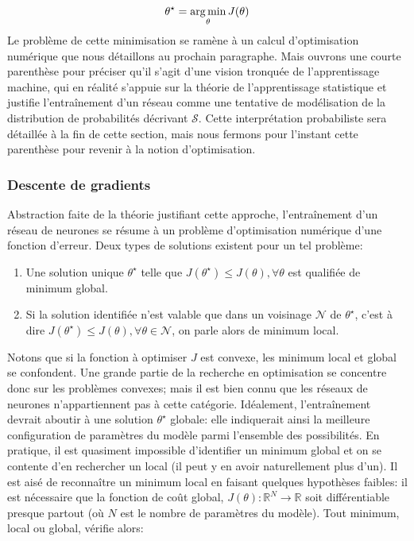 \begin{equation}
	\theta^\star = \operatorname*{arg\,min}_{\theta} J(\theta)
\end{equation}
Le problème de cette minimisation se ramène à un calcul d'optimisation numérique que nous détaillons au prochain paragraphe. Mais ouvrons une courte parenthèse pour préciser qu'il s'agit d'une vision tronquée de l'apprentissage machine, qui en réalité s'appuie sur la théorie de l'apprentissage statistique et justifie l'entraînement d'un réseau comme une tentative de modélisation de la distribution de probabilités décrivant $\mathcal{S}$.
Cette interprétation probabiliste sera détaillée à la fin de cette section, mais nous fermons pour l'instant cette parenthèse pour revenir à la notion d'optimisation.
\subsubsection{Descente de gradients}
Abstraction faite de la théorie justifiant cette approche, l'entraînement d'un réseau de neurones se résume à un problème d'optimisation numérique d'une fonction d'erreur. Deux types de solutions existent pour un tel problème:
\begin{enumerate}
	\item Une solution unique $\theta^\star$ telle que $J(\theta^\star) \leq J(\theta), \forall \theta$ est qualifiée de minimum global.
	\item Si la solution identifiée n'est valable que dans un voisinage $\mathcal{N}$ de $\theta^\star$, c'est à dire $J(\theta^\star) \leq J(\theta), \forall \theta \in \mathcal{N}$, on parle alors de minimum local.
\end{enumerate}
Notons que si la fonction à optimiser $J$ est convexe, les minimum local et global se confondent. Une grande partie de la recherche en optimisation se concentre donc sur les problèmes convexes; mais il est bien connu que les réseaux de neurones n'appartiennent pas à cette catégorie.
Idéalement, l'entraînement devrait aboutir à une solution $\theta^\star$ globale: elle indiquerait ainsi la meilleure configuration de paramètres du modèle parmi l'ensemble des possibilités. En pratique, il est quasiment impossible d'identifier un minimum global et on se contente d'en rechercher un local (il peut y en avoir naturellement plus d'un). Il est aisé de reconnaître un minimum local en faisant quelques hypothèses faibles: il est nécessaire que la fonction de coût global, $J(\theta): \mathbb{R}^N \to \mathbb{R}$ soit différentiable presque partout (où $N$ est le nombre de paramètres du modèle). Tout minimum, local ou global, vérifie alors:

